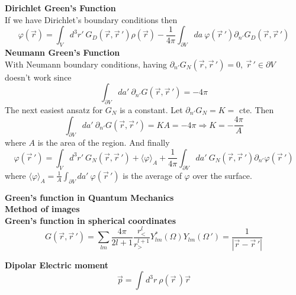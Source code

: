 \documentclass[12pt,a4paper]{article}
\newcommand{\integral}[3]{\int_{#1}^{#2} d #3 \ } %
\begin{document}
\textbf{Dirichlet Green's Function}\\
If we have Dirichlet's boundary conditions then 
\begin{equation}
	\varphi(\vec{r}) = \integral{V}{}{^3r'}G_D(\vec{r},\vec{r}\,') \rho(\vec{r}) -\frac{1}{4\pi} \integral{\partial V}{}{a}  \varphi(\vec{r}\,')\partial_{n'}G_D(\vec{r},\vec{r}\,')
\end{equation}
\textbf{Neumann Green's Function}\\
With Neumann boundary conditions, having $\partial_{n'} G_N(\vec{r},\vec{r}\,') = 0,\ \vec{r}\,'\in \partial V$ doesn't work since
\begin{equation}
	\integral{\partial V}{}{a'} \partial_{n'}G(\vec{r},\vec{r}\,') = -4\pi
\end{equation}
The next easiest ansatz for $G_N$ is a constant. Let $\partial_{n'} G_N = K = $ cte. Then
\begin{equation}
	\integral{\partial V}{}{a'} \partial_{n'}G(\vec{r},\vec{r}\,') = KA = -4\pi \Rightarrow K = -\frac{4\pi}{A}
\end{equation}
where $A$ is the area of the region. And finally
\begin{equation}
	\varphi(\vec{r}\,') = \integral{V}{}{^3r'} G_N(\vec{r},\vec{r}\,') + \langle \varphi \rangle_A + \frac{1}{4\pi}\integral{\partial V}{}{a'} G_N(\vec{r},\vec{r}\,') \partial_{n'} \varphi(\vec{r}\,')
\end{equation}
where $\langle \varphi \rangle_A = \frac{1}{A}\integral{\partial V}{}{a'} \varphi(\vec{r}\,')$ is the average of $\varphi$ over the surface.

\textbf{Green's function in Quantum Mechanics}\\

\textbf{Method of images}\\


\textbf{Green's function in spherical coordinates}\\
\begin{equation}
	G(\vec{r},\vec{r}\,') = \sum_{lm}\frac{4\pi}{2l+1} \frac{r_<^l}{r_>^{l+1}} Y_{lm}^*(\Omega)Y_{lm}(\Omega\,') = \frac{1}{|\vec{r}-\vec{r}\,'|}
\end{equation}

\textbf{Dipolar Electric moment}\\
\begin{equation}
	\vec{p} = \integral{}{}{^3r} \rho (\vec{r}\,)\vec{r}
\end{equation}
\end{document}
